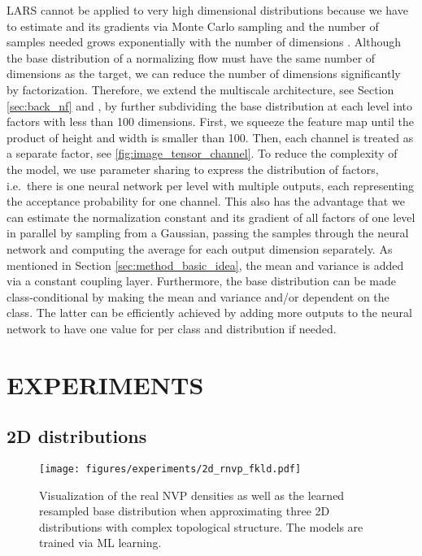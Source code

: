 \documentclass[twoside]{article}
\begin{document}
LARS cannot be applied to very high dimensional distributions because we have to estimate  and its gradients via Monte Carlo sampling and the number of samples needed grows exponentially with the number of dimensions \citep{Bauer2019}. Although the base distribution of a normalizing flow must have the same number of dimensions as the target, we can reduce the number of dimensions significantly by factorization. Therefore, we extend the multiscale architecture, see Section \ref{sec:back_nf} and \citep{Dinh2017}, by further subdividing the base distribution at each level into factors with less than 100 dimensions. First, we squeeze the feature map until the product of height and width is smaller than 100. Then, each channel is treated as a separate factor, see \autoref{fig:image_tensor_channel}. To reduce the complexity of the model, we use parameter sharing to express the distribution of factors, i.e.\ there is one neural network per level with multiple outputs, each representing the acceptance probability  for one channel. This also has the advantage that we can estimate the normalization constant and its gradient of all factors of one level in parallel by sampling from a Gaussian, passing the samples through the neural network and computing the average for each output dimension separately. As mentioned in Section \ref{sec:method_basic_idea}, the mean and variance is added via a constant coupling layer. Furthermore, the base distribution can be made class-conditional by making the mean and variance and/or  dependent on the class. The latter can be efficiently achieved by adding more outputs to the neural network to have one value for  per class and distribution if needed.


\section{EXPERIMENTS}

\subsection{2D distributions}
\label{sec:exp_2d}

\begin{figure*}[h]
    \centering
    \texttt{[image: figures/experiments/2d\_rnvp\_fkld.pdf]}
    \caption{Visualization of the real NVP densities as well as the learned resampled base distribution when approximating three 2D distributions with complex topological structure. The models are trained via ML learning.}
    \label{fig:2d_rnvp_fkld}
\end{figure*}
\end{document}
